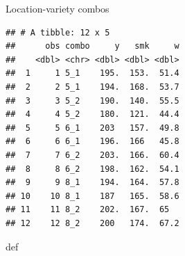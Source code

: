 \documentclass[ignorenonframetext,]{beamer}
\newenvironment{Shaded}{\begin{snugshade}}{\end{snugshade}}
\newcommand{\KeywordTok}[1]{\textcolor[rgb]{0.13,0.29,0.53}{\textbf{#1}}}
\newcommand{\NormalTok}[1]{#1}
\newcommand{\OperatorTok}[1]{\textcolor[rgb]{0.81,0.36,0.00}{\textbf{#1}}}
\newcommand{\StringTok}[1]{\textcolor[rgb]{0.31,0.60,0.02}{#1}}
\begin{document}
\begin{frame}[fragile]{Location-variety combos}
\protect\hypertarget{location-variety-combos}{}

\begin{Shaded}
\end{Shaded}

\begin{verbatim}
## # A tibble: 12 x 5
##      obs combo     y   smk     w
##    <dbl> <chr> <dbl> <dbl> <dbl>
##  1     1 5_1    195.  153.  51.4
##  2     2 5_1    194.  168.  53.7
##  3     3 5_2    190.  140.  55.5
##  4     4 5_2    180.  121.  44.4
##  5     5 6_1    203   157.  49.8
##  6     6 6_1    196.  166   45.8
##  7     7 6_2    203.  166.  60.4
##  8     8 6_2    198.  162.  54.1
##  9     9 8_1    194.  164.  57.8
## 10    10 8_1    187   165.  58.6
## 11    11 8_2    202.  167.  65  
## 12    12 8_2    200   174.  67.2
\end{verbatim}

def

\end{frame}
\end{document}
